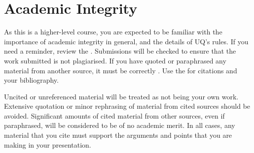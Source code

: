 \documentclass{csse4400}
\begin{document}
\section{Academic Integrity}
As this is a higher-level course, you are expected to be familiar with the importance of academic integrity in general, and the details of UQ's rules.
If you need a reminder, review the .
Submissions will be checked to ensure that the work submitted is not plagiarised.
If you have quoted or paraphrased any material from another source, it must be correctly .
Use the  for citations and your bibliography.

Uncited or unreferenced material will be treated as not being your own work.
Extensive quotation or minor rephrasing of material from cited sources should be avoided.
Significant amounts of cited material from other sources, even if paraphrased, will be considered to be of no academic merit.
In all cases, any material that you cite must support the arguments and points that you are making in your presentation.



\end{document}
